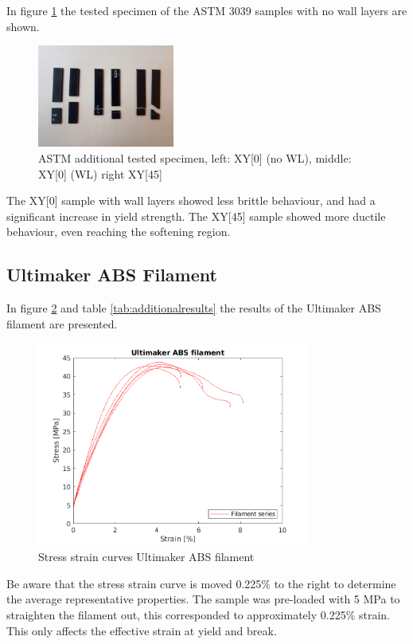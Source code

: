 In figure \ref{fig:ASTM3039addspecimen} the tested specimen of the ASTM 3039 samples with no wall layers are shown.
\begin{figure}[H]
    \centering
    \includegraphics[width=0.40\textwidth]{chapter_5_Experimentaltesting/figures/imageASTMadd.jpg}
    \caption{ASTM additional tested specimen, left: XY[0] (no WL), middle: XY[0] (WL) right XY[45]}
    \label{fig:ASTM3039addspecimen}
\end{figure}
The XY[0] sample with wall layers showed less brittle behaviour, and had a significant increase in yield strength. The XY[45] sample showed  more ductile behaviour, even reaching the softening region.


\subsection{Ultimaker ABS Filament}
In figure \ref{fig:filamentresults} and table \ref{tab:additionalresults} the results of the Ultimaker ABS filament are presented.
\begin{figure}[H]
    \centering
    \includegraphics[width=0.80\textwidth]{chapter_5_Experimentaltesting/figures/filamentdata.png}
    \caption{Stress strain curves Ultimaker ABS filament}
    \label{fig:filamentresults}
\end{figure}
Be aware that the stress strain curve is moved 0.225\% to the right to determine the average representative properties. The sample was pre-loaded with 5 MPa to straighten the filament out, this corresponded to approximately 0.225\% strain. This only affects the effective strain at yield and break.

